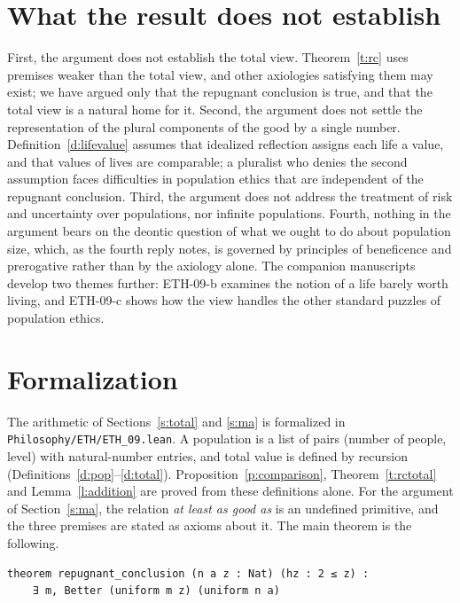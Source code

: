 \documentclass{situationist-preprint}
\begin{document}
\section{What the result does not establish}\label{s:notestablish}

First, the argument does not establish the total view. Theorem~\ref{t:rc} uses premises weaker than the total view, and other axiologies satisfying them may exist; we have argued only that the repugnant conclusion is true, and that the total view is a natural home for it. Second, the argument does not settle the representation of the plural components of the good by a single number. Definition~\ref{d:lifevalue} assumes that idealized reflection assigns each life a value, and that values of lives are comparable; a pluralist who denies the second assumption faces difficulties in population ethics that are independent of the repugnant conclusion. Third, the argument does not address the treatment of risk and uncertainty over populations, nor infinite populations. Fourth, nothing in the argument bears on the deontic question of what we ought to do about population size, which, as the fourth reply notes, is governed by principles of beneficence and prerogative rather than by the axiology alone. The companion manuscripts develop two themes further: ETH-09-b examines the notion of a life barely worth living, and ETH-09-c shows how the view handles the other standard puzzles of population ethics.

\section{Formalization}\label{s:formal}

The arithmetic of Sections~\ref{s:total} and \ref{s:ma} is formalized in \nolinkurl{Philosophy/ETH/ETH_09.lean}. A population is a list of pairs (number of people, level) with natural-number entries, and total value is defined by recursion (Definitions~\ref{d:pop}--\ref{d:total}). Proposition~\ref{p:comparison}, Theorem~\ref{t:rctotal} and Lemma~\ref{l:addition} are proved from these definitions alone. For the argument of Section~\ref{s:ma}, the relation \emph{at least as good as} is an undefined primitive, and the three premises are stated as axioms about it. The main theorem is the following.

\begin{lstlisting}
theorem repugnant_conclusion (n a z : Nat) (hz : 2 ≤ z) :
    ∃ m, Better (uniform m z) (uniform n a)
\end{lstlisting}
\end{document}
